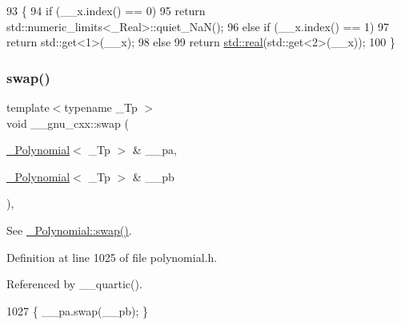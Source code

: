 \begin{DoxyCode}
93     \{
94       \textcolor{keywordflow}{if} (\_\_x.index() == 0)
95         \textcolor{keywordflow}{return} std::numeric\_limits<\_Real>::quiet\_NaN();
96       \textcolor{keywordflow}{else} \textcolor{keywordflow}{if} (\_\_x.index() == 1)
97         \textcolor{keywordflow}{return} std::get<1>(\_\_x);
98       \textcolor{keywordflow}{else}
99         \textcolor{keywordflow}{return} \hyperlink{namespace____gnu__cxx_a2743043701f8e4c87d3f0f06ddb11348}{std::real}(std::get<2>(\_\_x));
100     \}
\end{DoxyCode}
\mbox{\label{namespace____gnu__cxx_a10d002d78eb10d846416335ca9599c7a}} 
\subsubsection{\texorpdfstring{swap()}{swap()}}
{\footnotesize\ttfamily template$<$typename \+\_\+\+Tp $>$ \\
void \+\_\+\+\_\+gnu\+\_\+cxx\+::swap (\begin{DoxyParamCaption}\item[{\hyperlink{class____gnu__cxx_1_1__Polynomial}{\+\_\+\+Polynomial}$<$ \+\_\+\+Tp $>$ \&}]{\+\_\+\+\_\+pa,  }\item[{\hyperlink{class____gnu__cxx_1_1__Polynomial}{\+\_\+\+Polynomial}$<$ \+\_\+\+Tp $>$ \&}]{\+\_\+\+\_\+pb }\end{DoxyParamCaption})\hspace{0.3cm}{\ttfamily [inline]}, {\ttfamily [noexcept]}}

See \hyperlink{class____gnu__cxx_1_1__Polynomial_aec8b248101f7340d46fbac13b07b45bc}{\+\_\+\+Polynomial\+::swap()}. 

Definition at line 1025 of file polynomial.\+h.



Referenced by \+\_\+\+\_\+quartic().


\begin{DoxyCode}
1027     \{ \_\_pa.swap(\_\_pb); \}
\end{DoxyCode}
\mbox{\label{namespace____gnu__cxx_aa21adeccc5b87713003459ab7f08fc7b}} 
